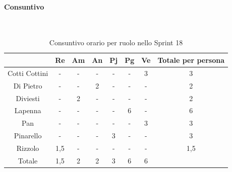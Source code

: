 \documentclass{article}
\begin{document}
            \paragraph{Consuntivo}\mbox{}\\
            \begin{table}[H]
                \centering
                \begin{tabular}{|c|c|c|c|c|c|c|c|}
                \hline
                              & Re  & Am  & An  & Pj  & Pg  & Ve  & Totale per persona \\ \hline
                Cotti Cottini & -   & -   & -   & -   & -   & 3   & 3                  \\ \hline
                Di Pietro     & -   & -   & 2   & -   & -   & -   & 2                  \\ \hline
                Diviesti      & -   & 2   & -   & -   & -   & -   & 2                  \\ \hline
                Lapenna       & -   & -   & -   & -   & 6   & -   & 6                  \\ \hline
                Pan           & -   & -   & -   & -   & -   & 3   & 3                  \\ \hline
                Pinarello     & -   & -   & -   & 3   & -   & -   & 3                  \\ \hline
                Rizzolo       & 1,5 & -   & -   & -   & -   & -   & 1,5                \\ \hline
                Totale        & 1,5 & 2   & 2   & 3   & 6   & 6   &                    \\ \hline
                \end{tabular}
                \caption{Consuntivo orario per ruolo nello Sprint 18}
            \end{table}

\end{document}
